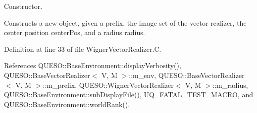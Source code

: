Constructor. 

Constructs a new object, given a prefix, the image set of the vector realizer, the center position {\ttfamily center\-Pos}, and a radius {\ttfamily radius}. 

Definition at line 33 of file Wigner\-Vector\-Realizer.\-C.



References Q\-U\-E\-S\-O\-::\-Base\-Environment\-::display\-Verbosity(), Q\-U\-E\-S\-O\-::\-Base\-Vector\-Realizer$<$ V, M $>$\-::m\-\_\-env, Q\-U\-E\-S\-O\-::\-Base\-Vector\-Realizer$<$ V, M $>$\-::m\-\_\-prefix, Q\-U\-E\-S\-O\-::\-Wigner\-Vector\-Realizer$<$ V, M $>$\-::m\-\_\-radius, Q\-U\-E\-S\-O\-::\-Base\-Environment\-::sub\-Display\-File(), U\-Q\-\_\-\-F\-A\-T\-A\-L\-\_\-\-T\-E\-S\-T\-\_\-\-M\-A\-C\-R\-O, and Q\-U\-E\-S\-O\-::\-Base\-Environment\-::world\-Rank().


